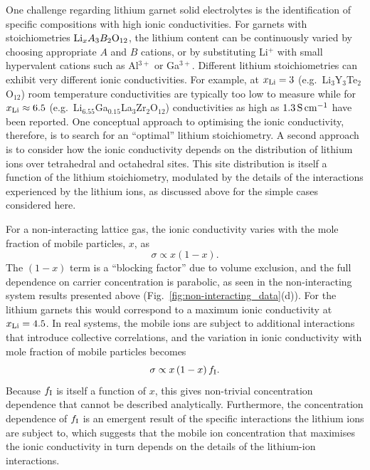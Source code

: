 \documentclass[aps,prb,twocolumn,superscriptaddress,reprint]{revtex4-1}
\newcommand{\xLi}{x_\m{Li}}
\begin{document}
One challenge regarding lithium garnet solid electrolytes is the identification of specific compositions with high ionic conductivities. For garnets with stoichiometries $\mathrm{Li}_xA_3B_2\mathrm{O}_{12}$, the lithium content can be continuously varied by choosing appropriate $A$ and $B$ cations, or by substituting Li$^+$ with small hypervalent cations such as Al$^{3+}$ or Ga$^{3+}$. Different lithium stoichiometries can exhibit very different ionic conductivities. For example, at $\xLi=3$ (e.g.\ Li$_3$Y$_3$Te$_2$O$_{12}$) room temperature conductivities are typically too low to measure\cite{OCallaghanEtAl_ChemMater2006,BachmanEtAl_ChemRev2016,ThangaduraiEtAl_JPhysChemLett2015} 
while for $\xLi\approx6.5$ (e.g.\ Li$_{6.55}$Ga$_{0.15}$La$_3$Zr$_2$O$_{12}$) conductivities as high as $1.3\,\mathrm{S}\,\mathrm{cm}^{-1}$ have been reported.\cite{Bernuy-LopezEtAl_ChemMater2014,RettenwanderEtAl_InorgChem2014} One conceptual approach to optimising the ionic conductivity, therefore, is to search for an  ``optimal'' lithium stoichiometry.\cite{MuruganEtAl_JElectrochemSoc2008,MuruganEtAl_Ionics2007,RamakumarEtAl_DaltonTrans2015,MiaraEtAl_ChemMater2013,XieEtAl_ChemMater2011,MuruganEtAl_MaterSciEngB2007,OCallaghanAndCussen_ChemComm2007,XuEtAl_PhysRevB2012,ChenEtAl_SciRep2017} A second approach is to consider how the ionic conductivity depends on the distribution of lithium ions over tetrahedral and octahedral sites.\cite{ChenEtAl_ChemMater2015,ThangaduraiEtAl_JAmCeramSoc2003,MuruganEtAl_MaterSciEngB2007,OCallaghanAndCussen_ChemComm2007} This site distribution is itself a function of the lithium stoichiometry, modulated by the details of the interactions experienced by the lithium ions, as discussed above for the simple cases considered here.
 
For a non-interacting lattice gas, the ionic conductivity varies with the mole fraction of mobile particles, $x$, as
\begin{equation}
  \sigma \propto x \left(1-x\right).
\end{equation}
The $(1-x)$ term is a ``blocking factor'' due to volume exclusion,\cite{Kutner_PhysLett1981} and the full dependence on carrier concentration is parabolic, as seen in the non-interacting system results presented above (Fig.\ \ref{fig:non-interacting_data}(d)). For the lithium garnets this would correspond to a maximum ionic conductivity at $\xLi=4.5$. In real systems, the mobile ions are subject to additional interactions that introduce collective correlations, and the variation in ionic conductivity with mole fraction of mobile particles becomes
\begin{equation}
  \sigma \propto x \left(1-x\right)f_{\mathrm{I}}.
  \label{eqn:sigma_conc_dependence}
\end{equation}
Because $f_{\mathrm{I}}$ is itself a function of $x$, this gives non-trivial concentration dependence that cannot be described analytically. Furthermore, the concentration dependence of $f_{\mathrm{I}}$ is an emergent result of the specific interactions the lithium ions are subject to, which suggests that the mobile ion concentration that maximises the ionic conductivity in turn depends on the details of the lithium-ion interactions. 
\end{document}
